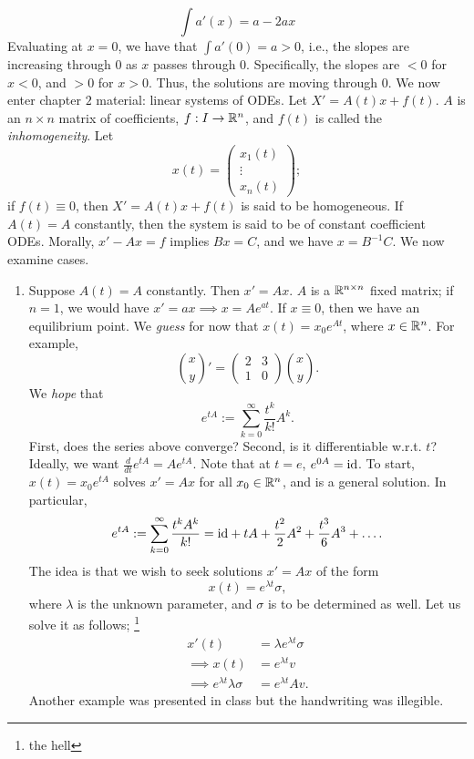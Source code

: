 \[ \int a'(x) = a - 2ax \]
Evaluating at $x = 0$, we have that $\int a'(0) = a > 0$, i.e., the slopes are increasing through $0$ as $x$ passes through $0$. Specifically, the slopes are $< 0$ for $x < 0$, and $> 0$ for $x > 0$. Thus, the solutions are moving through $0$.
\medskip\newline
We now enter chapter $2$ material: linear systems of ODEs. Let $X' = A(t) x + f(t)$. $A$ is an $n \times n$ matrix of coefficients, $f : I \to \mathbb R^n$, and $f(t)$ is called the \textit{inhomogeneity}. Let
\[ x(t) = \begin{pmatrix} x_1(t) \\ \vdots \\ x_n(t) \end{pmatrix}; \]
if $f(t) \equiv 0$, then $X' = A(t) x + f(t)$ is said to be homogeneous. If $A(t) = A$ constantly, then the system is said to be of constant coefficient ODEs. Morally, $x' - Ax = f$ implies $Bx = C$, and we have $x = B^{-1} C$. We now examine cases.
\begin{enumerate}[label=(\alph*)]
    \item Suppose $A(t) = A$ constantly. Then $x' = Ax$. $A$ is a $\mathbb R^{n \times n}$ fixed matrix; if $n = 1$, we would have $x' = ax \implies x = Ae^{at}$. If $x \equiv 0$, then we have an equilibrium point. We \textit{guess} for now that $x(t) = x_0 e^{At}$, where $x \in \mathbb R^n$. For example,
    \[ \binom{x}{y}' = \begin{pmatrix} 2 & 3 \\ 1 & 0 \end{pmatrix} \binom{x}{y}. \]
    We \textit{hope} that
    \[ e^{tA} := \sum_{k=0}^\infty \frac{t^k}{k!} A^k. \]
    First, does the series above converge? Second, is it differentiable w.r.t. $t$? Ideally, we want $\frac{d}{dt} e^{tA} = A e^{tA}$. Note that at $t = e$, $e^{0A} = \mathrm{id}$. To start, $x(t) = x_0 e^{tA}$ solves $x' = Ax$ for all $x_0 \in \mathbb R^n$, and is a general solution. In particular,
    \[ e^{tA} := \sum_{k=0}^\infty \frac{t^k A^k}{k!} = \mathrm{id} + tA + \frac{t^2}{2}A^2 + \frac{t^3}{6}A^3 + \dots. \]
    The idea is that we wish to seek solutions $x' = Ax$ of the form
    \[ x(t) = e^{\lambda t} \sigma, \]
    where $\lambda$ is the unknown parameter, and $\sigma$ is to be determined as well. Let us solve it as follows; \footnote{the hell}
    \begin{align*}
        x'(t) &= \lambda e^{\lambda t} \sigma \\
        \implies x(t) &= e^{\lambda t} v \\
        \implies e^{\lambda t} \lambda \sigma &= e^{\lambda t} A v.
    \end{align*}
    Another example was presented in class but the handwriting was illegible.
\end{enumerate}